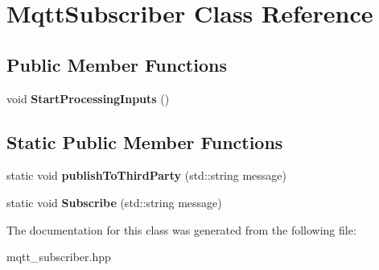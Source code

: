 \hypertarget{classMqttSubscriber}{}\section{Mqtt\+Subscriber Class Reference}
\label{classMqttSubscriber}
\subsection*{Public Member Functions}
\begin{DoxyCompactItemize}
\item 
\mbox{\label{classMqttSubscriber_a1dc5293a63d0e9908ba6e2d067ad76d0}} 
void {\bfseries Start\+Processing\+Inputs} ()
\end{DoxyCompactItemize}
\subsection*{Static Public Member Functions}
\begin{DoxyCompactItemize}
\item 
\mbox{\label{classMqttSubscriber_a583fdadde54af3df974d6804a9686d4b}} 
static void {\bfseries publish\+To\+Third\+Party} (std\+::string message)
\item 
\mbox{\label{classMqttSubscriber_a4bca80e48ea35bae160daf395da0ab9b}} 
static void {\bfseries Subscribe} (std\+::string message)
\end{DoxyCompactItemize}


The documentation for this class was generated from the following file\+:\begin{DoxyCompactItemize}
\item 
mqtt\+\_\+subscriber.\+hpp\end{DoxyCompactItemize}
